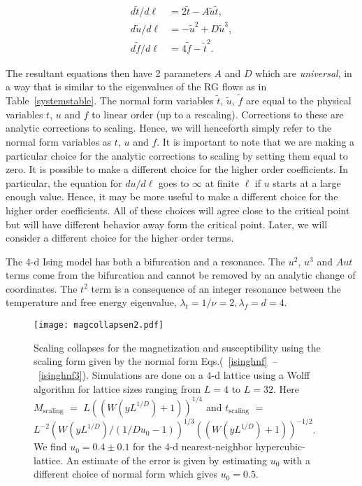 \documentclass[
 reprint,
 amsmath,amssymb,
 aps, superscriptaddress, pre
]{revtex4-1}
\begin{document}

\begin{align}
 {d \tilde t}/{d \ell} &= 2 \tilde{t} - A \tilde{u} \tilde{t} , \label{isinghnf} \\ 
 {d \tilde u}/{d \ell} &= - \tilde{u}^2 + D \tilde{u}^3, \label{isinghnf2} \\
 {d \tilde f}/{d \ell} &= 4 \tilde f - {\tilde t}^2 \label{isinghnf3} .
\end{align} 


The resultant equations then have 2 parameters $A$ and $D$ which
are \textit{universal}, in a way that is similar to the eigenvalues of the RG flows as in Table~\ref{systemstable}. The normal form variables $\tilde t$, $\tilde u$, $\tilde f$ are equal to the physical variables $t$, $u$ and $f$ to linear order (up to a rescaling). Corrections to these are analytic corrections to scaling. Hence, we will henceforth simply refer to the normal form variables as $t$, $u$ and $f$. It is important to note that we are making a particular choice for the analytic corrections to scaling by setting them equal to zero. It is possible to make a different choice for the higher order coefficients. In particular, the equation for $d u/d \ell$ goes to $\infty$ at finite $\ell$ if $u$ starts at a large enough value. Hence, it may be more useful to make a different choice for the higher order coefficients. All of these choices will agree close to the critical point but will have different behavior away form the critical point. Later, we will consider a different choice for the higher order terms.

The 4-d Ising model has both a bifurcation and a resonance. The $u^2$, $u^3$ and $A u t$ terms come from the bifurcation and cannot be removed
by an analytic change of coordinates. The $t^2$ term is a consequence of
an integer resonance between the temperature and free energy eigenvalue,
$\lambda_t = 1/\nu = 2, \lambda_f = d = 4$. 


\begin{figure}
 \texttt{[image: magcollapsen2.pdf]}
\caption{Scaling collapses for the magnetization and susceptibility using the scaling form given by the normal form Eqs.(~\ref{isinghnf}~--~\ref{isinghnf3}). Simulations are done on a 4-d lattice using a Wolff algorithm for lattice sizes ranging from $L = 4$ to $L = 32$. Here $M_\mathrm{scaling}$ $=$ $L ((W(y L^{1/D})+1))^{1/4}$ and $t_{\mathrm{scaling}}$ $=$ $L^{-2} (W(y L^{1/D})/(1/D u_0 - 1))^{1/3} ((W(y L^{1/D})+1))^{-1/2}$. We find $u_0 = 0.4\pm0.1$ for the 4-d nearest-neighbor hypercubic-lattice. An estimate of the error is given by estimating $u_0$ with a different choice of normal form which gives $u_0 = 0.5$.  }
\label{collapses1}
 \end{figure}
\end{document}
